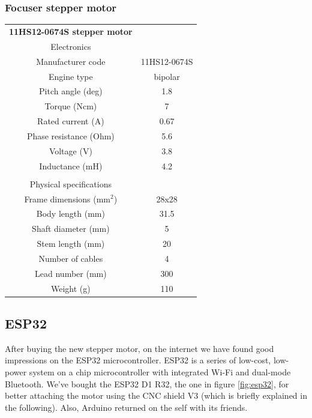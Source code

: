 \documentclass{article}
\begin{document}
\begin{multicols}{2}
        \subsubsection{Focuser stepper motor}
        \begin{minipage}{0.5\textwidth}
            \centering
            \begin{tabular}{cc}
                \textbf{11HS12-0674S stepper motor}&\\
                Electronics&\\
                \hline
                Manufacturer code & 11HS12-0674S\\
                Engine type & bipolar\\
                Pitch angle (deg) & 1.8 \\
                Torque (Ncm)& 7\\
                Rated current (A) & 0.67\\
                Phase resistance (Ohm)& 5.6\\
                Voltage (V)& 3.8\\
                Inductance (mH)& 4.2\\
                 & \\
                Physical specifications&\\
                \hline
                Frame dimensions (mm\(^2\))& 28x28 \\
                Body length (mm)& 31.5 \\
                Shaft diameter (mm)& 5 \\
                Stem length (mm)& 20 \\
                Number of cables & 4\\
                Lead number (mm)& 300 \\
                Weight (g) & 110\\
                \hline
            \end{tabular}
            \label{tab:nema_11_specifics}
        \end{minipage}

        \subsection{ESP32}
        After buying the new stepper motor, on the internet we have found good impressions on the ESP32 microcontroller.
        ESP32 is a series of low-cost, low-power system on a chip microcontroller with integrated Wi-Fi and dual-mode Bluetooth.
        We've bought the ESP32 D1 R32, the one in figure \ref{fig:esp32}, for better attaching the motor using the CNC shield V3 (which is briefly explained in the following).
        Also, Arduino returned on the self with its friends.


\end{multicols}
\end{document}
